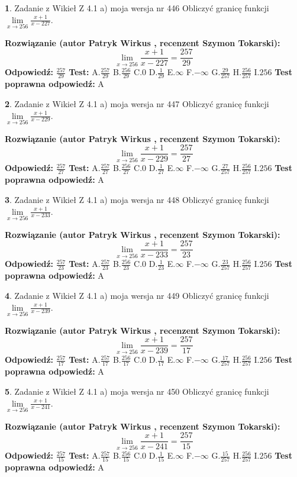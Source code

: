 \documentclass[12pt, a4paper]{article}
\theoremstyle{definition} %
\newtheorem{zad}{}
\newcommand{\zadStart}[1]{\begin{zad}#1\newline}
\newcommand{\zadStop}{\end{zad}}
\newcommand{\rozwStart}[2]{\noindent \textbf{Rozwiązanie (autor #1 , recenzent #2): }\newline}
\newcommand{\rozwStop}{\newline}
\newcommand{\odpStart}{\noindent \textbf{Odpowiedź:}\newline}
\newcommand{\odpStop}{\newline}
\newcommand{\testStart}{\noindent \textbf{Test:}\newline}
\newcommand{\testStop}{\newline}
\newcommand{\kluczStart}{\noindent \textbf{Test poprawna odpowiedź:}\newline}
\newcommand{\kluczStop}{\newline}
\begin{document}
\zadStart{Zadanie z Wikieł Z 4.1 a) moja wersja nr 446}
Obliczyć granicę funkcji $\lim\limits_{x\to256}\frac{x+1}{x-227}$.
\zadStop
\rozwStart{Patryk Wirkus}{Szymon Tokarski}
$$\lim\limits_{x\to256}\frac{x+1}{x-227} = \frac{257}{29}$$
\rozwStop
\odpStart
$\frac{257}{29}$
\odpStop
\testStart
A.$\frac{257}{29}$
B.$\frac{256}{29}$
C.$0$
D.$\frac{1}{29}$
E.$\infty$
F.$-\infty$
G.$\frac{29}{257}$
H.$\frac{256}{257}$
I.$256$
\testStop
\kluczStart
A
\kluczStop



\zadStart{Zadanie z Wikieł Z 4.1 a) moja wersja nr 447}
Obliczyć granicę funkcji $\lim\limits_{x\to256}\frac{x+1}{x-229}$.
\zadStop
\rozwStart{Patryk Wirkus}{Szymon Tokarski}
$$\lim\limits_{x\to256}\frac{x+1}{x-229} = \frac{257}{27}$$
\rozwStop
\odpStart
$\frac{257}{27}$
\odpStop
\testStart
A.$\frac{257}{27}$
B.$\frac{256}{27}$
C.$0$
D.$\frac{1}{27}$
E.$\infty$
F.$-\infty$
G.$\frac{27}{257}$
H.$\frac{256}{257}$
I.$256$
\testStop
\kluczStart
A
\kluczStop



\zadStart{Zadanie z Wikieł Z 4.1 a) moja wersja nr 448}
Obliczyć granicę funkcji $\lim\limits_{x\to256}\frac{x+1}{x-233}$.
\zadStop
\rozwStart{Patryk Wirkus}{Szymon Tokarski}
$$\lim\limits_{x\to256}\frac{x+1}{x-233} = \frac{257}{23}$$
\rozwStop
\odpStart
$\frac{257}{23}$
\odpStop
\testStart
A.$\frac{257}{23}$
B.$\frac{256}{23}$
C.$0$
D.$\frac{1}{23}$
E.$\infty$
F.$-\infty$
G.$\frac{23}{257}$
H.$\frac{256}{257}$
I.$256$
\testStop
\kluczStart
A
\kluczStop



\zadStart{Zadanie z Wikieł Z 4.1 a) moja wersja nr 449}
Obliczyć granicę funkcji $\lim\limits_{x\to256}\frac{x+1}{x-239}$.
\zadStop
\rozwStart{Patryk Wirkus}{Szymon Tokarski}
$$\lim\limits_{x\to256}\frac{x+1}{x-239} = \frac{257}{17}$$
\rozwStop
\odpStart
$\frac{257}{17}$
\odpStop
\testStart
A.$\frac{257}{17}$
B.$\frac{256}{17}$
C.$0$
D.$\frac{1}{17}$
E.$\infty$
F.$-\infty$
G.$\frac{17}{257}$
H.$\frac{256}{257}$
I.$256$
\testStop
\kluczStart
A
\kluczStop



\zadStart{Zadanie z Wikieł Z 4.1 a) moja wersja nr 450}
Obliczyć granicę funkcji $\lim\limits_{x\to256}\frac{x+1}{x-241}$.
\zadStop
\rozwStart{Patryk Wirkus}{Szymon Tokarski}
$$\lim\limits_{x\to256}\frac{x+1}{x-241} = \frac{257}{15}$$
\rozwStop
\odpStart
$\frac{257}{15}$
\odpStop
\testStart
A.$\frac{257}{15}$
B.$\frac{256}{15}$
C.$0$
D.$\frac{1}{15}$
E.$\infty$
F.$-\infty$
G.$\frac{15}{257}$
H.$\frac{256}{257}$
I.$256$
\testStop
\kluczStart
A
\kluczStop
\end{document}
